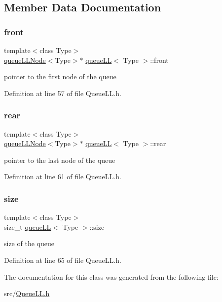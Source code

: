 \subsection{Member Data Documentation}
\mbox{\label{classqueue_l_l_a622ea439d113fe8e4616320ec2346d8b}} 
\subsubsection{\texorpdfstring{front}{front}}
{\footnotesize\ttfamily template$<$class Type$>$ \\
\hyperlink{classqueue_l_l_node}{queue\+L\+L\+Node}$<$Type$>$$\ast$ \hyperlink{classqueue_l_l}{queue\+LL}$<$ Type $>$\+::front\hspace{0.3cm}{\ttfamily [private]}}

pointer to the first node of the queue 

Definition at line 57 of file Queue\+L\+L.\+h.

\mbox{\label{classqueue_l_l_aab0540567095f05fb1c981a2e7e4e93e}} 
\subsubsection{\texorpdfstring{rear}{rear}}
{\footnotesize\ttfamily template$<$class Type$>$ \\
\hyperlink{classqueue_l_l_node}{queue\+L\+L\+Node}$<$Type$>$$\ast$ \hyperlink{classqueue_l_l}{queue\+LL}$<$ Type $>$\+::rear\hspace{0.3cm}{\ttfamily [private]}}

pointer to the last node of the queue 

Definition at line 61 of file Queue\+L\+L.\+h.

\mbox{\label{classqueue_l_l_af2ae538d6971624f1c8404d3a8502aa0}} 
\subsubsection{\texorpdfstring{size}{size}}
{\footnotesize\ttfamily template$<$class Type$>$ \\
size\+\_\+t \hyperlink{classqueue_l_l}{queue\+LL}$<$ Type $>$\+::size\hspace{0.3cm}{\ttfamily [private]}}

size of the queue 

Definition at line 65 of file Queue\+L\+L.\+h.



The documentation for this class was generated from the following file\+:\begin{DoxyCompactItemize}
\item 
src/\hyperlink{_queue_l_l_8h}{Queue\+L\+L.\+h}\end{DoxyCompactItemize}
